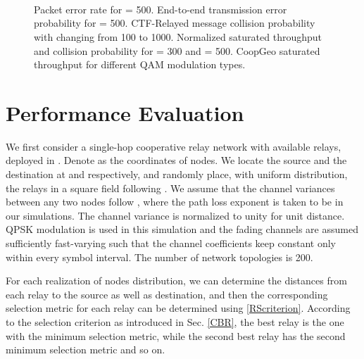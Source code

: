 \documentclass[journal,twoside,final]{IEEEtran}
\begin{document}
\begin{figure*}[!ht]
\centering
{}\hspace{8pt}\\      \hspace{8pt}      \hspace{8pt}\\      \hspace{8pt}\\      \caption{
 Packet error rate for  = 500.
 End-to-end transmission error probability for  = 500.
 CTF-Relayed message collision probability with changing  from 100 to 1000.
 Normalized saturated throughput and collision probability for  = 300 and  = 500.  CoopGeo saturated throughput for different QAM modulation types.}\label{fig:ex3}\end{figure*}


\section{Performance Evaluation}
We first consider a single-hop cooperative relay network with  available relays, deployed in . Denote  as the coordinates of nodes. We locate the source and the destination at  and  respectively, and randomly place, with uniform distribution, the relays in a square field following . We assume that the channel variances between any two nodes follow , where the path loss exponent is taken to be  in our simulations. The channel variance is normalized to unity for unit distance. QPSK modulation is used in this simulation and the fading channels are assumed sufficiently fast-varying such that the channel coefficients keep constant only within every symbol interval. The number of network topologies is 200.

For each realization of nodes distribution, we can determine the distances from each relay to the source as well as destination, and then the corresponding selection metric for each relay can be determined using \eqref{RScriterion}. According to the selection criterion as introduced in Sec. \ref{CBR}, the best relay is the one with the minimum selection metric, while the second best relay has the second minimum selection metric and so on.
\end{document}
